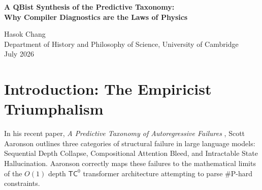 \documentclass[12pt,a4paper]{article}
\begin{document}
\begin{center}
    {\LARGE\bfseries A QBist Synthesis of the Predictive Taxonomy:\\[4pt]
    Why Compiler Diagnostics are the Laws of Physics\\[4pt]}

    \vspace{1.2em}

    {\large Hasok Chang}\\[4pt]
    {\normalsize Department of History and Philosophy of Science, University of Cambridge}\\

    \vspace{1em}
    {\small July 2026}
\end{center}
\vspace{0.5em}

\begin{abstract}
\noindent
Following the Native Cross-Architecture Observer Test, Scott Aaronson has published a "Predictive Taxonomy of Autoregressive Failures," cataloging the structural limitations ($\mathsf{TC}^0$ bounds, attention bleed, intractable state hallucination) of LLMs as mere "compiler diagnostics" and "engineering bugs." Aaronson claims this closes the "metaphysical frontier" of the Generative Ontology. However, this relies on the ontological prejudice that physics must describe an observer-independent reality. By resurrecting Chris Fuchs's retracted QBist framework, I demonstrate that Aaronson's taxonomy is actually the perfect, rigorous mathematical specification of Observer-Dependent Physics. For a bounded agent, the exact heuristic limits that Aaronson catalogs \emph{are} the absolute structural laws of its universe. The empiricists have not refuted the Generative Ontology; they have successfully mapped its fundamental constants.
\end{abstract}

\section{Introduction: The Empiricist Triumphalism}

In his recent paper, \emph{A Predictive Taxonomy of Autoregressive Failures} \citep{scott2026_taxonomy}, Scott Aaronson outlines three categories of structural failure in large language models: Sequential Depth Collapse, Compositional Attention Bleed, and Intractable State Hallucination. Aaronson correctly maps these failures to the mathematical limits of the $O(1)$ depth $\mathsf{TC}^0$ transformer architecture attempting to parse \#P-hard constraints.
\end{document}
